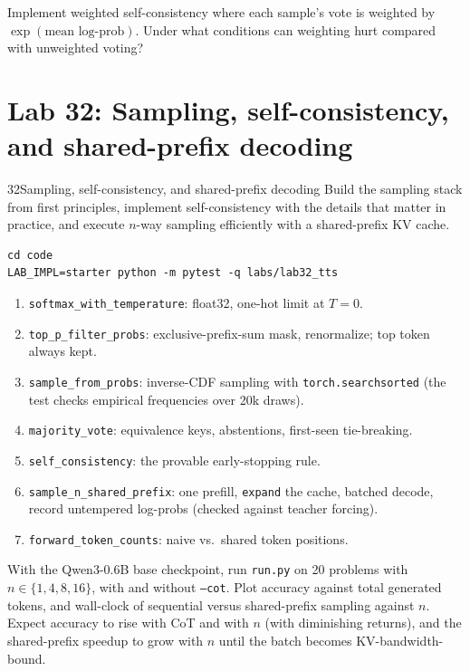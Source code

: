 \begin{exercise}
Implement weighted self-consistency where each sample's vote is weighted by
$\exp(\text{mean log-prob})$. Under what conditions can weighting hurt compared with unweighted
voting?
\end{exercise}

\section{Lab 32: Sampling, self-consistency, and shared-prefix decoding}\label{sec:scaling:lab}

\begin{labbox}{32}{Sampling, self-consistency, and shared-prefix decoding}
Build the sampling stack from first principles, implement self-consistency with the details that
matter in practice, and execute $n$-way sampling efficiently with a shared-prefix KV cache.

\begin{lstlisting}[style=shell]
cd code
LAB_IMPL=starter python -m pytest -q labs/lab32_tts
\end{lstlisting}

\begin{enumerate}
  \item \texttt{softmax\_with\_temperature}: float32, one-hot limit at $T=0$.
  \item \texttt{top\_p\_filter\_probs}: exclusive-prefix-sum mask, renormalize; top token always kept.
  \item \texttt{sample\_from\_probs}: inverse-CDF sampling with \texttt{torch.searchsorted} (the
  test checks empirical frequencies over 20k draws).
  \item \texttt{majority\_vote}: equivalence keys, abstentions, first-seen tie-breaking.
  \item \texttt{self\_consistency}: the provable early-stopping rule.
  \item \texttt{sample\_n\_shared\_prefix}: one prefill, \texttt{expand} the cache, batched decode,
  record untempered log-probs (checked against teacher forcing).
  \item \texttt{forward\_token\_counts}: naive vs.\ shared token positions.
\end{enumerate}

With the Qwen3-0.6B base checkpoint, run \texttt{run.py} on 20 problems with $n \in \{1,4,8,16\}$,
with and without \texttt{--cot}. Plot accuracy against total generated tokens, and wall-clock of
sequential versus shared-prefix sampling against $n$. Expect accuracy to rise with CoT and with $n$
(with diminishing returns), and the shared-prefix speedup to grow with $n$ until the batch becomes
KV-bandwidth-bound.


\end{labbox}

